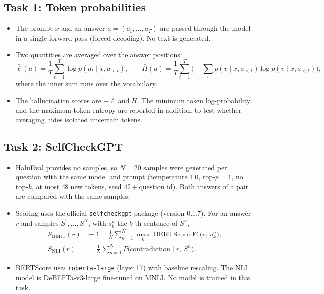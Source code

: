 \documentclass[11pt,a4paper]{article}
\begin{document}
\subsection{Task 1: Token probabilities}

\begin{itemize}
  \item The prompt $x$ and an answer $a=(a_1,\dots,a_T)$ are passed through the model in a single
        forward pass (forced decoding). No text is generated.
  \item Two quantities are averaged over the answer positions:
        \begin{equation}
        \bar{\ell}(a) = \frac{1}{T}\sum_{t=1}^{T} \log p(a_t \mid x, a_{<t}),
        \qquad
        \bar{H}(a) = \frac{1}{T}\sum_{t=1}^{T} \Big(-\sum_{v} p(v \mid x, a_{<t}) \log p(v \mid x, a_{<t})\Big),
        \end{equation}
        where the inner sum runs over the vocabulary.
  \item The hallucination scores are $-\bar{\ell}$ and $\bar{H}$. The minimum token
        log-probability and the maximum token entropy are reported in addition, to test whether
        averaging hides isolated uncertain tokens.
\end{itemize}

\subsection{Task 2: SelfCheckGPT}

\begin{itemize}
  \item HaluEval provides no samples, so $N=20$ samples were generated per question with the same
        model and prompt (temperature 1.0, top-$p=1$, no top-$k$, at most 48 new tokens, seed
        $42+\text{question id}$). Both answers of a pair are compared with the same samples.
  \item Scoring uses the official \texttt{selfcheckgpt} package (version 0.1.7). For an answer $r$
        and samples $S^1,\dots,S^N$, with $s^n_k$ the $k$-th sentence of $S^n$,
        \begin{align}
        S_{\text{BERT}}(r) &= 1 - \frac{1}{N}\sum_{n=1}^{N} \max_{k}\; \text{BERTScore-F1}\big(r,\, s^{n}_{k}\big), \\
        S_{\text{NLI}}(r)  &= \frac{1}{N}\sum_{n=1}^{N} P\big(\text{contradiction} \mid r,\, S^{n}\big).
        \end{align}
  \item BERTScore uses \texttt{roberta-large} (layer 17) with baseline rescaling. The NLI model is
        DeBERTa-v3-large fine-tuned on MNLI. No model is trained in this task.
\end{itemize}
\end{document}
